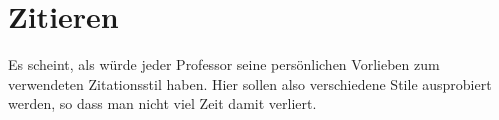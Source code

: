 \newpage
\section{Zitieren}
Es scheint, als würde jeder Professor seine persönlichen Vorlieben zum verwendeten Zitationsstil haben. Hier sollen also verschiedene Stile ausprobiert werden, so dass man nicht viel Zeit damit verliert.
